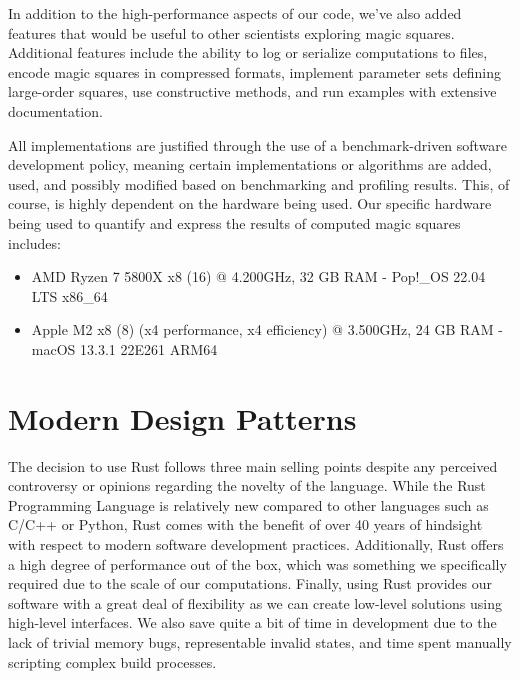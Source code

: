\documentclass[12pt]{report}
\begin{document}
\par In addition to the high-performance aspects of our code, we've also added features that would
be useful to other scientists exploring magic squares. Additional features include the ability to
log or serialize computations to files, encode magic squares in compressed formats, implement
parameter sets defining large-order squares, use constructive methods, and run examples with
extensive documentation.

\par All implementations are justified through the use of a benchmark-driven software development
policy, meaning certain implementations or algorithms are added, used, and possibly modified based
on benchmarking and profiling results. This, of course, is highly dependent on the hardware being
used. Our specific hardware being used to quantify and express the results of computed magic
squares includes:

\begin{itemize}
  \item AMD Ryzen 7 5800X x8 (16) @ 4.200GHz, 32 GB RAM \hyphen{}  Pop!\_OS 22.04 LTS x86\_64
  \item Apple M2 x8 (8) (x4 performance, x4 efficiency) @ 3.500GHz, 24 GB RAM \hyphen{} macOS
        13.3.1
        22E261 ARM64
\end{itemize}

\section{Modern Design Patterns}

\par The decision to use Rust follows three main selling points despite any perceived controversy
or opinions regarding the novelty of the language. While the Rust Programming Language is
relatively new compared to other languages such as C/C++ or Python, Rust comes with the benefit of
over 40 years of hindsight with respect to modern software development practices. Additionally,
Rust offers a high degree of performance out of the box, which was something we specifically
required due to the scale of our computations. Finally, using Rust provides our software with a
great deal of flexibility as we can create low-level solutions using high-level interfaces. We also
save quite a bit of time in development due to the lack of trivial memory bugs, representable
invalid states, and time spent manually scripting complex build processes.
\end{document}
